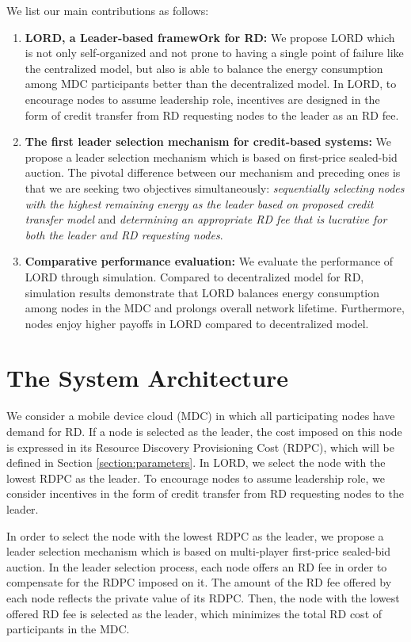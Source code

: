 \documentclass[journal,12pt, onecolumn]{IEEEtran}
\begin{document}
We list our main contributions as follows:
\begin{enumerate}
\item \textbf{LORD, a Leader-based framewOrk for RD:} 
We propose LORD which is not only self-organized and not prone to having a single point of failure like the centralized model, but also is able to balance the energy consumption among MDC participants better than the decentralized model. In LORD, to encourage nodes to assume leadership role, incentives are designed in the form of credit transfer from RD requesting nodes to the leader as an RD fee. 


\item \textbf{The first leader selection mechanism for credit-based systems:}
We propose a leader selection mechanism which is based on first-price sealed-bid auction. The pivotal difference between our mechanism and preceding ones is that we are seeking two objectives simultaneously: \textit{sequentially selecting nodes with the highest remaining energy as the leader based on proposed credit transfer model} and \textit{determining an appropriate RD fee that is lucrative for both the leader and RD requesting nodes}.

\item \textbf{Comparative performance evaluation:}
We evaluate the performance of LORD through simulation. Compared to decentralized model for RD, simulation results demonstrate that LORD balances energy consumption among nodes in the MDC and prolongs overall network lifetime. Furthermore, nodes enjoy higher payoffs in LORD compared to decentralized model.

\end{enumerate}




\section{The System Architecture}
We consider a mobile device cloud (MDC) in which all participating nodes have demand for RD. If a node is selected as the leader, the cost imposed on this node is expressed in its Resource Discovery Provisioning Cost (RDPC), which will be defined in Section \ref{section:parameters}. In LORD, we select the node with the lowest RDPC as the leader. To encourage nodes to assume leadership role, we consider incentives in the form of credit transfer from RD requesting nodes to the leader. 

In order to select the node with the lowest RDPC as the leader, we propose a leader selection mechanism which is based on multi-player first-price sealed-bid auction. In the leader selection process, each node offers an RD fee in order to compensate for the RDPC imposed on it. The amount of the RD fee offered by each node reflects the private value of its RDPC. Then, the node with the lowest offered RD fee is selected as the leader, which minimizes the total RD cost of participants in the MDC. 
\end{document}
